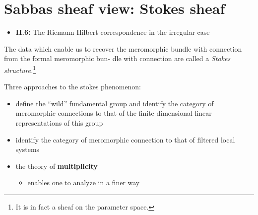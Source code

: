\section{Sabbas sheaf view: Stokes sheaf}%
\begin{frame}[t]
  {\Huge\insertsection{}}
  \begin{itemize}
    \item \cite{sabbah2007isomonodromic} \textbf{II.6:}
      The Riemann-Hilbert correspondence in the irregular case
  \end{itemize}

  \textcolor{green!60!black}{%
    The data which enable us to recover the meromorphic bundle with connection
    from the formal meromorphic bun- dle with connection are called a
    \emph{Stokes structure.}\footnote{It is in fact a sheaf on the parameter
    space.}
  }

  Three approaches to the stokes phenomenon:
  \begin{itemize}
    \item define the ``wild'' fundamental group and identify the category of
      meromorphic connections to that of the finite dimensional linear
      representations of this group
    \item identify the category of meromorphic connection to that of filtered
      local systems
    \item the theory of \textbf{multiplicity}
      \begin{itemize}
        \item enables one to analyze in a finer way
      \end{itemize}
  \end{itemize}
\end{frame}

